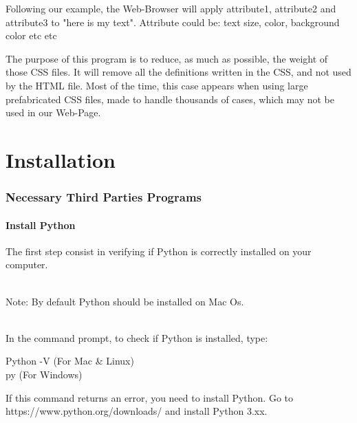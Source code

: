 \documentclass[10pt,letterpaper]{article}
\begin{document}
Following our example, the Web-Browser will apply attribute1, attribute2 and attribute3 to "here is my text". Attribute could be: text size, color, background color etc etc


The purpose of this program is to reduce, as much as possible, the weight of those CSS files. It will remove all the definitions written in the CSS, and not used by the HTML file. Most of the time, this case appears when using large prefabricated CSS files, made to handle thousands of cases, which may not be used in our Web-Page. 

\newpage
\renewcommand*\contentsname{\Huge Table of Contents}
\tableofcontents
\newpage

\part {Installation}
\setcounter{section}{0}
\section {Necessary Third Parties Programs}
\subsection {Install Python}
The first step consist in verifying if Python is correctly installed on your computer.\\
\begin{itshape}
\\Note: By default Python should be installed on Mac Os.\\
\end{itshape}
\\In the command prompt, to check if Python is installed, type:
\begin{mdframed}[backgroundcolor=black, fontcolor=white]
Python -V \hfill(For Mac \& Linux)\\
py \hfill(For Windows)
\end{mdframed}
If this command returns an error, you need to install Python. Go to https://www.python.org/downloads/ and install Python 3.xx.
\end{document}
